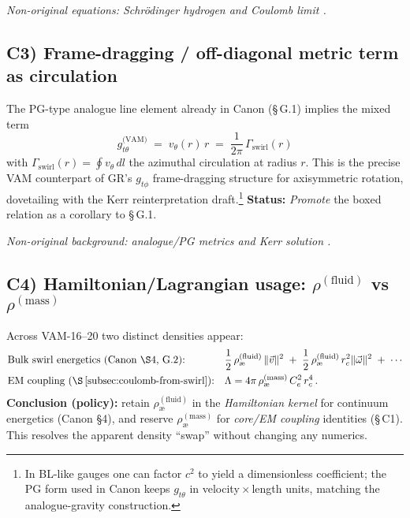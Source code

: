 \documentclass[11pt,a4paper]{article}
\begin{document}
    \textit{Non-original equations: Schr\"odinger hydrogen and Coulomb limit \cite{Schrodinger1926,Jackson1999}.}

    \subsection*{C3) Frame-dragging / off-diagonal metric term as circulation}
    \label{subsec:metric-circulation}

    The PG-type analogue line element already in Canon (\S\,G.1) implies the mixed term
    \[
        \boxed{ g_{t\theta}^{\text{(VAM)}} \;=\; v_\theta(r)\,r \;=\; \frac{1}{2\pi}\,\Gamma_{\text{swirl}}(r) }
    \]
    with $\Gamma_{\text{swirl}}(r)=\oint v_\theta\,dl$ the azimuthal circulation at radius $r$.
    This is the precise VAM counterpart of GR's $g_{t\phi}$ frame-dragging structure for axisymmetric rotation, dovetailing with the Kerr reinterpretation draft.\footnote{In BL-like gauges one can factor $c^2$ to yield a dimensionless coefficient; the PG form used in Canon keeps $g_{t\theta}$ in velocity\,$\times$\,length units, matching the analogue-gravity construction.}
    \textbf{Status:} \emph{Promote} the boxed relation as a corollary to \S\,G.1.

    \textit{Non-original background: analogue/PG metrics and Kerr solution \cite{Painleve1921,Gullstrand1922,Unruh1981,Visser1998,Kerr1963}.}

    \subsection*{C4) Hamiltonian/Lagrangian usage: $\rho^{(\text{fluid})}$ vs $\rho^{(\text{mass})}$}
    \label{subsec:rho-policy}

    Across VAM-16–20 two distinct densities appear:
    \begin{align*}
        &\text{Bulk swirl energetics (Canon \S4, G.2):}
        &&\frac{1}{2}\,\rho_{\text{\ae}}^{(\text{fluid})}\,\lVert \vec v\rVert^2
        \;+\;\frac{1}{2}\,\rho_{\text{\ae}}^{(\text{fluid})}\,r_c^{2}\lVert \vec\omega\rVert^2
        \;+\;\cdots \\
        &\text{EM coupling (\S\,\ref{subsec:coulomb-from-swirl}):}
        &&\Lambda = 4\pi\,\rho_{\text{\ae}}^{(\text{mass})}\,C_e^2\,r_c^4\,.
    \end{align*}
    \textbf{Conclusion (policy):} retain $\rho_{\text{\ae}}^{(\text{fluid})}$ in the \emph{Hamiltonian kernel} for continuum energetics (Canon \S4), and reserve $\rho_{\text{\ae}}^{(\text{mass})}$ for \emph{core/EM coupling} identities (\S\,C1). This resolves the apparent density ``swap'' without changing any numerics.
\end{document}
